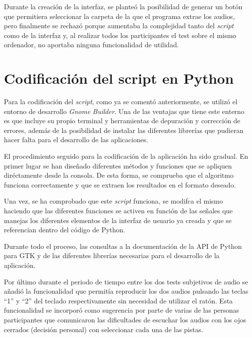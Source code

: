 \documentclass[11pt,a4paper,twoside]{book}
\begin{document}
            Durante la creación de la interfaz, se planteó la posibilidad de generar un botón que permitiera seleccionar la carpeta de la que el programa extrae los audios, pero finalmente se rechazó porque aumentaba la complejidad tanto del \textit{script} como de la interfaz y, al realizar todos los participantes el test sobre el mismo ordenador, no aportaba ninguna funcionalidad de utilidad.
            
        \section{Codificación del script en Python}
            Para la codificación del \textit{script}, como ya se comentó anteriormente, se utilizó el entorno de desarrollo \textit{Gnome Builder}. Una de las ventajas que tiene este enterno es que incluye su propio terminal y herramientas de depuración y corrección de errores, además de la posibilidad de instalar las diferentes librerías que pudieran hacer falta para el desarrollo de las aplicaciones.
            
            El procedimiento seguido para la codificación de la aplicación ha sido gradual. En primer lugar se han diseñado diferentes métodos y funciones que se apliquen diréctamente desde la consola. De esta forma, se comprueba que el algoritmo funciona correctamente y que se extraen los resultados en el formato deseado.
            
            Una vez, se ha comprobado que este \textit{script} funciona, se modifca el mismo haciendo que las diferentes funciones se activen en función de las señales que manejas los diferentes elementos de la interfaz de usuario ya creada y que se referencian dentro del código de Python.
            
            Durante todo el proceso, las consultas a la documentación de la API de Python para GTK \cite{GTKAPI} y de las diferentes librerías necesarias para el desarrollo de la aplicación.
            
            Por último durante el periodo de tiempo entre los dos tests subjetivos de audio se añadió la funcionalidad que permitía reproducir los dos audios pulsando las teclas ``1'' y ``2'' del teclado respectivamente sin necesidad de utilizar el ratón. Esta funcionalidad se incorporó como sugerencia por parte de varias de las personas participantes que comunicaron las dificultades de escuchar los audios con los ojos cerrados (decisión personal) con seleccionar cada una de las pistas.
            
\end{document}
